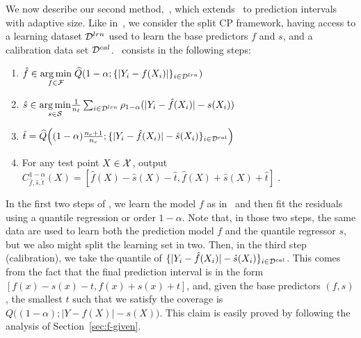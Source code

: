 We now describe our second method,~\methodAD, which extends \method~to prediction intervals with adaptive size. Like in~\method, we consider the split CP framework, having access to a learning dataset ${\cal D}^{lrn}$ used to learn the base predictors $f$ and $s$, and a calibration data set ${\cal D}^{cal}$. %
\methodAD~consists in the following steps:%
\begin{enumerate}[leftmargin=*]
    \item $\hat{f} \in \underset{f\in\mathcal{F}}{\operatorname*{arg\,min}}  \; \widehat{Q}(1-\alpha;\{|Y_i-f(X_i)|\}_{i\in{\cal D}^{lrn}})$
    \item $\hat{s} \in \underset{s\in{\cal S}}{\operatorname*{arg\,min}}\frac{1}{n_\ell}\sum_{i\in{\cal D}^{lrn}}\rho_{1-\alpha}(|Y_i-\hat{f}(X_i)| - s(X_i))$
    \item $\hat{t} = \widehat{Q}\Big((1-\alpha)\frac{n_c+1}{n_c};\{|Y_i-\hat{f}(X_i)| - \hat{s}(X_i)\}_{i\in{\cal D}^{cal}}\Big)$
    \item For any test point $X\in{\cal X}$, output $C_{\hat{f}, \hat{s},\hat{t}}^{1-\alpha}(X) = [\hat{f}(X)-\hat{s}(X)-\hat{t},\hat{f}(X)+\hat{s}(X) +\hat{t}] \; .$
\end{enumerate}
\vspace{-.4em}
%
In the first two steps of \methodAD, we learn the model $f$ as in \method~and then fit the residuals using a quantile regression or order $1-\alpha$. %
Note that, in those two steps, the same data are used to learn both the prediction model $f$ and the quantile regressor $s$, but we also might split the learning set in two. %
Then, in the third step (calibration), we take the quantile of $\{|Y_i-\hat{f}(X_i)| - \hat{s}(X_i)\}_{i\in{\cal D}^{cal}}$. %
This comes from the fact that the final prediction interval is in the form $[f(x)-s(x)-t,f(x)+s(x)+t]$, and, given the base predictors $(f, s)$, the smallest $t$ such that we satisfy the coverage is $Q\big((1-\alpha);|Y-f(X)| - s(X)\big)$. This claim is easily proved by following the analysis of Section~\ref{sec:f-given}. 

